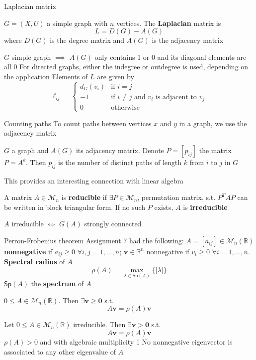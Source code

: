 \documentclass[aspectratio=43]{beamer}
\def\IR{\mathbb{R}}
\def\bv{\mathbf{v}}
\def\b0{\mathbf{0}}
\def\M{\mathcal{M}}
\begin{document}
\begin{frame}{Laplacian matrix}
\begin{definition}
	$G=(X,U)$ a simple graph with $n$ vertices. The \textbf{Laplacian} matrix is 
	\[
		L=D(G)-A(G)
	\]
	where $D(G)$ is the degree matrix and $A(G)$ is the adjacency matrix
\end{definition}
$G$ simple graph $\implies$ $A(G)$ only contains 1 or 0 and its diagonal elements are all 0
\vfill
For directed graphs, either the indegree or outdegree is used, depending on the application
\vfill
Elements of $L$ are given by
\[
\ell_{ij}=\begin{cases}
	d_G(v_{i}) & \text{if } i=j\\
	-1 & \text{if } i\neq j \text{ and } v_{i} 
	\text{ is adjacent to }v_{j}\\
	0 & \text{otherwise}
\end{cases}
\]
\end{frame}

\begin{frame}{Counting paths}
	To count paths between vertices $x$ and $y$ in a graph, we use the adjacency matrix
	\vfill
	\begin{theorem}
		$G$ a graph and $A(G)$ its adjacency matrix. Denote $P=[p_{ij}]$ the matrix $P=A^k$. Then $p_{ij}$ is the number of distinct paths of length $k$ from $i$ to $j$ in $G$
	\end{theorem}
	\vfill
	This provides an interesting connection with linear algebra
	\begin{definition}
		A matrix $A\in\M_n$ is \textbf{reducible} if $\exists P\in\M_n$, permutation matrix, s.t. $P^TAP$ can be written in block triangular form. If no such $P$ exists, $A$ is \textbf{irreducible}
	\end{definition}
	\vfill
	\begin{theorem}
		$A$ irreducible $\iff$ $G(A)$ strongly connected
	\end{theorem}
\end{frame}


\begin{frame}{Perron-Frobenius theorem}
Assignment 7 had the following:
\vfill
$A=[a_{ij}]\in\M_n(\IR)$ \textbf{nonnegative} if $a_{ij}\geq 0$ $\forall i,j=1,\ldots,n$; $\bv\in\IR^n$ nonnegative if $v_i\geq 0$ $\forall i=1,\ldots,n$.  \textbf{Spectral radius} of $A$
\[
\rho(A) = \max_{\lambda\in\mathsf{Sp}(A)}\{|\lambda|\}
\]
$\mathsf{Sp}(A)$ the \textbf{spectrum} of $A$
\vfill
\begin{theorem}
$0\leq A\in\M_n(\IR)$. Then $\exists\bv\geq\b0$ s.t. 
\[
	A\bv=\rho(A)\bv
\]
\end{theorem}
\vfill

\begin{theorem}
	\label{th:PF}
	Let $0\leq A\in \M_n(\IR)$ irreducible. Then $\exists\bv>\b0$ s.t.
	\[
		A\bv=\rho(A)\bv
	\]
	$\rho(A)>0$ and with algebraic multiplicity 1
	\vskip0.5cm
	No nonnegative eigenvector is associated to any other eigenvalue of $A$
\end{theorem}
\end{frame}
\end{document}
